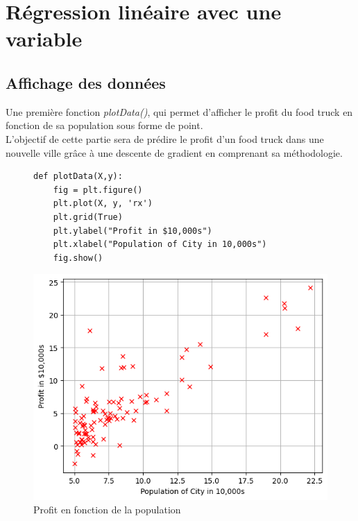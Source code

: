 \section{Régression linéaire avec une variable}
\subsection{Affichage des données}

Une première fonction \textit{plotData()}, qui permet d'afficher le profit du food truck en fonction de sa population sous forme de point. \\
L'objectif de cette partie sera de prédire le profit d'un food truck dans une nouvelle ville grâce à une descente de gradient en comprenant sa méthodologie.

\begin{figure}[!h]
    \begin{minipage}{.48\linewidth}
\begin{verbatim}
def plotData(X,y):
    fig = plt.figure()
    plt.plot(X, y, 'rx')
    plt.grid(True)
    plt.ylabel("Profit in $10,000s")
    plt.xlabel("Population of City in 10,000s")
    fig.show()
\end{verbatim}   
    \end{minipage}\hfill
    \begin{minipage}{.48\linewidth}
        \begin{center}
            \includegraphics[width=1\textwidth]{./img/4-1.png}
            \caption{\label{fig:fig1}Profit en fonction de la population}  
        \end{center}
    \end{minipage}
\end{figure}



